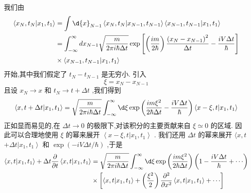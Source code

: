 我们由
\begin{equation}
\begin{aligned}
	\left\langle {{x}_{N},{t}_{N} | {x}_{1},{t}_{1}}\right\rangle &= \int \d{x}_{N - 1}\left\langle {{x}_{N},{t}_{N} | {x}_{N - 1},{t}_{N - 1}}\right\rangle \left\langle {{x}_{N - 1},{t}_{N - 1} | {x}_{1},{t}_{1}}\right\rangle\\
	&= \int_{-\infty }^{\infty }d{x}_{N - 1}\sqrt{\frac{m}{{2\pi i}\hbar {\Delta t}}}\exp \left\lbrack {\left( \frac{im}{2\hbar }\right) \frac{{\left( {x}_{N} - {x}_{N - 1}\right) }^{2}}{\Delta t} - \frac{iV\Delta t}{\hbar }}\right\rbrack\\
	&\times \left\langle {{x}_{N - 1},{t}_{N - 1} | {x}_{1},{t}_{1}}\right\rangle
\end{aligned}
\end{equation}
开始,其中我们假定了 ${t}_{N} - {t}_{N - 1}$ 是无穷小. 引入
\begin{equation}
\xi = {x}_{N} - {x}_{N - 1}
\end{equation}
且设 ${x}_{N} \rightarrow x$ 和 ${t}_{N} \rightarrow t + {\Delta t}$ ,我们得到
\begin{equation}
\left\langle {x, t + {\Delta t} | {x}_{1},{t}_{1}}\right\rangle = \sqrt{\frac{m}{{2\pi i}\hbar {\Delta t}}}\int_{-\infty }^{\infty }{\d \xi }\exp \left( {\frac{{im}{\xi }^{2}}{2\hbar {\Delta t}} - \frac{iV\Delta t}{\hbar }}\right) \left\langle {x - \xi, t | {x}_{1},{t}_{1}}\right\rangle
\end{equation}
正如显而易见的,在 ${\Delta t} \rightarrow 0$ 的极限下,对该积分的主要贡献来自 $\xi \simeq 0$ 的区域. 因此可以合理地使用 $\xi$ 的幂来展开 $\left\langle {x - \xi, t | {x}_{1},{t}_{1}}\right\rangle$ . 我们还用 ${\Delta t}$ 的幂来展开 $\langle x, t$ $+ {\Delta t}\left| {{x}_{1},{t}_{1}}\right\rangle$ 和 $\exp \left( {-{iV\Delta t}/\hbar }\right)$ ,于是
\begin{equation}
\begin{aligned}
	\left\langle {x, t | {x}_{1},{t}_{1}}\right\rangle + {\Delta t}\frac{\partial }{\partial t}\left\langle {x, t | {x}_{1},{t}_{1}}\right\rangle &= \sqrt{\frac{m}{{2\pi i}\hbar {\Delta t}}}\int_{-\infty }^{\infty }{\d \xi }\exp \left( \frac{{im}{\xi }^{2}}{2\hbar {\Delta t}}\right) \left( {1 - \frac{iV\Delta t}{\hbar } + \cdots }\right)\\
	&\times \left\lbrack {\left\langle {x, t | {x}_{1},{t}_{1}}\right\rangle + \left( \frac{{\xi }^{2}}{2}\right) \frac{{\partial }^{2}}{\partial {x}^{2}}\left\langle {x, t | {x}_{1},{t}_{1}}\right\rangle + \cdots }\right\rbrack
\end{aligned}
\end{equation}
